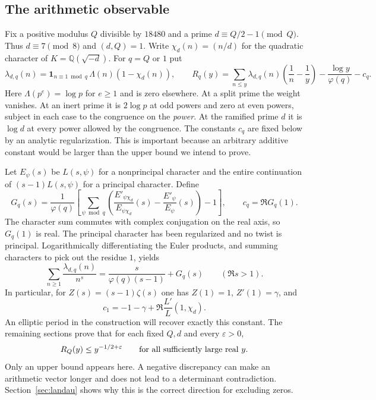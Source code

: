 \subsection{The arithmetic observable}\label{sec:observable}
Fix a positive modulus \(Q\) divisible by \(18480\) and a prime \(d\equiv Q/2-1\pmod Q\). Thus \(d\equiv7\pmod8\) and \((d,Q)=1\). Write \(\chi_d(n)=(n/d)\) for the quadratic character of \(K=\mathbb Q(\sqrt{-d})\). For \(q=Q\) or \(1\) put
\[
 \lambda_{d,q}(n)=\mathbf1_{n\equiv1\bmod q}\,\Lambda(n)(1-\chi_d(n)),\qquad
 R_q(y)=\sum_{n\le y}\lambda_{d,q}(n)
 \left(\frac1n-\frac1y\right)-\frac{\log y}{\varphi(q)}-c_q.
\]
Here \(\Lambda(p^e)=\log p\) for \(e\ge1\) and is zero elsewhere. At a split prime the weight vanishes. At an inert prime it is \(2\log p\) at odd powers and zero at even powers, subject in each case to the congruence on the \emph{power}. At the ramified prime \(d\) it is \(\log d\) at every power allowed by the congruence. The constants \(c_q\) are fixed below by an analytic regularization. This is important because an arbitrary additive constant would be larger than the upper bound we intend to prove.

Let \(E_\psi(s)\) be \(L(s,\psi)\) for a nonprincipal character and the entire continuation of \((s-1)L(s,\psi)\) for a principal character. Define
\begin{equation}\label{eq:Gmean}
 G_q(s)=\frac1{\varphi(q)}
 \left[\sum_{\psi\bmod q}
 \left(\frac{E'_{\psi\chi_d}}{E_{\psi\chi_d}}(s)
       -\frac{E'_\psi}{E_\psi}(s)\right)-1\right],
 \qquad c_q=\Re G_q(1).
\end{equation}
The character sum commutes with complex conjugation on the real axis, so \(G_q(1)\) is real. The principal character has been regularized and no twist is principal. Logarithmically differentiating the Euler products, and summing characters to pick out the residue \(1\), yields
\[
   \sum_{n\ge1}\frac{\lambda_{d,q}(n)}{n^s}
        =\frac{s}{\varphi(q)(s-1)}+G_q(s) \qquad(\Re s>1).
\]
In particular, for \(Z(s)=(s-1)\zeta(s)\) one has \(Z(1)=1\), \(Z'(1)=\gamma\), and
\[
                c_1=-1-\gamma+\Re\frac{L'}{L}(1,\chi_d).
\]
An elliptic period in the construction will recover exactly this constant. The remaining sections prove that for each fixed \(Q,d\) and every \(\varepsilon>0\),
\begin{equation}\label{eq:target}
                R_Q(y)\le y^{-1/2+\varepsilon}
                \qquad\hbox{for all sufficiently large real }y.
\end{equation}
Only an upper bound appears here. A negative discrepancy can make an arithmetic vector longer and does not lead to a determinant contradiction. Section~\ref{sec:landau} shows why this is the correct direction for excluding zeros.
